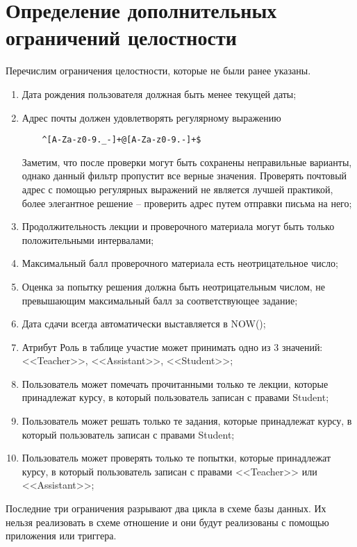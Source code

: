 \documentclass[a4paper,14pt]{article}
\begin{document}
\section{Определение дополнительных ограничений целостности}
Перечислим ограничения целостности, которые не были ранее указаны.
\begin{enumerate}
	\item Дата рождения пользователя должная быть менее текущей даты;
	\item Адрес почты должен удовлетворять регулярному выражению 
	
	\begin{lstlisting}	
	^[A-Za-z0-9._-]+@[A-Za-z0-9.-]+$
	\end{lstlisting}
	
	Заметим, что после проверки могут быть сохранены неправильные варианты, однако данный фильтр пропустит все верные значения.
	Проверять почтовый адрес с помощью регулярных выражений не является лучшей практикой, более элегантное решение -- проверить адрес путем отправки письма на него;
	\item  Продолжительность лекции и проверочного материала могут быть только положительными интервалами;
	\item Максимальный балл проверочного материала есть неотрицательное число;
	\item Оценка за попытку решения должна быть неотрицательным числом, не превышающим максимальный балл за соответствующее задание;
	\item Дата сдачи всегда автоматически выставляется в NOW();
	\item Атрибут Роль в таблице участие может принимать одно из 3 значений: <<Teacher>>, <<Assistant>>, <<Student>>;
	\item Пользователь может помечать прочитанными только те лекции, которые принадлежат курсу, в который пользователь записан с правами Student;
	\item Пользователь может решать только те задания, которые принадлежат курсу, в который пользователь записан с правами Student;
	\item Пользователь может проверять только те попытки, которые принадлежат курсу, в который пользователь записан с правами <<Teacher>> или <<Assistant>>;
\end{enumerate}

Последние три ограничения разрывают два цикла в схеме базы данных.
Их нельзя реализовать в схеме отношение и они будут реализованы с помощью приложения или триггера.
\end{document}
